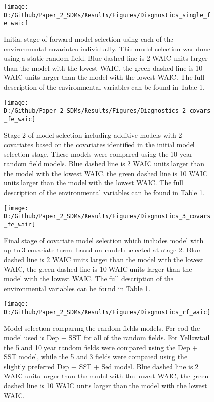 \documentclass[
]{article}
\begin{document}
\begin{landscape} 
\newpage
\begin{figure}
\texttt{[image: D:/Github/Paper\_2\_SDMs/Results/Figures/Diagnostics\_single\_fe\_waic]} \caption{Initial stage of forward model selection using each of the environmental covariates individually.  This model selection was done using a static random field. Blue dashed line is 2 WAIC units larger than the model with the lowest WAIC, the green dashed line is 10 WAIC units larger than the model with the lowest WAIC. The full description of the environmental variables can be found in Table 1.}\label{fig:diag-1-fe}
\end{figure}

\newpage
\begin{figure}
\texttt{[image: D:/Github/Paper\_2\_SDMs/Results/Figures/Diagnostics\_2\_covars\_fe\_waic]} \caption{Stage 2 of model selection including additive models with 2 covariates based on the covariates identified in the initial model selection stage. These models were compared using the 10-year random field models. Blue dashed line is 2 WAIC units larger than the model with the lowest WAIC, the green dashed line is 10 WAIC units larger than the model with the lowest WAIC. The full description of the environmental variables can be found in Table 1.}\label{fig:diag-2-fe}
\end{figure}

\newpage
\begin{figure}
\texttt{[image: D:/Github/Paper\_2\_SDMs/Results/Figures/Diagnostics\_3\_covars\_fe\_waic]} \caption{Final stage of covariate model selection which includes model with up to 3 covariate terms based on models selected at stage 2. Blue dashed line is 2 WAIC units larger than the model with the lowest WAIC, the green dashed line is 10 WAIC units larger than the model with the lowest WAIC. The full description of the environmental variables can be found in Table 1.}\label{fig:diag-3-fe}
\end{figure}

\newpage
\begin{figure}
\texttt{[image: D:/Github/Paper\_2\_SDMs/Results/Figures/Diagnostics\_rf\_waic]} \caption{Model selection comparing the random fields models.  For cod the model used is Dep + SST for all of the random fields.  For Yellowtail the 5 and 10 year random fields were compared using the Dep + SST model, while the 5 and 3 fields were compared using the slightly preferred Dep + SST + Sed model. Blue dashed line is 2 WAIC units larger than the model with the lowest WAIC, the green dashed line is 10 WAIC units larger than the model with the lowest WAIC.}\label{fig:diag-rf}
\end{figure}
\end{landscape}
\end{document}
